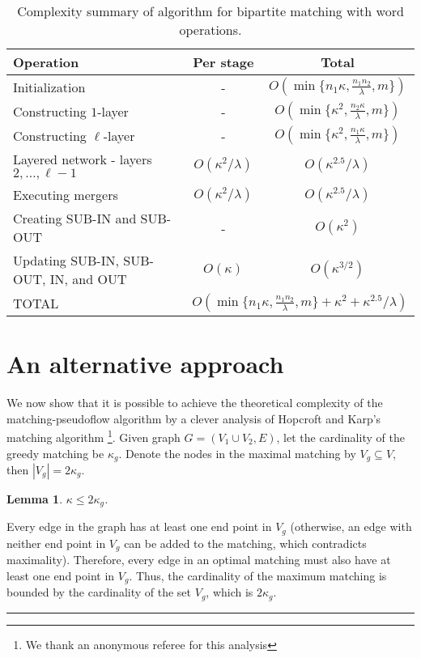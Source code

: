 \documentclass{article}
\newtheorem{lemma}{Lemma}[section]
\newenvironment{proof}[1][Proof:]{\begin{trivlist}
\item[\hskip \labelsep {\bfseries #1}]}{\end{trivlist}}
\newcommand{\qed}{\hfill \rule{2.5mm}{2.5mm}}
\begin{document}
\begin{table}[ht]
\begin{center}
\begin{tabular}{||l|c|c||} \hline
\hline Operation & Per stage & Total\\
\hline
Initialization & - & $O(\min\{n_1\kappa, \frac{n_1n_2}{\lambda},m\})$\\
Constructing $1$-layer & - & $O(\min\{\kappa^2, \frac{n_2\kappa}{\lambda},m\})$\\
Constructing $\ell$-layer & -& $O(\min\{\kappa^2,\frac{n_1\kappa}{\lambda}, m\})$ \\
Layered network - layers $2,\ldots ,\ell -1$ & $O(\kappa^{2}/\lambda)$ & $O(\kappa^{2.5}/\lambda)$\\
Executing mergers & $O(\kappa^{2}/\lambda)$ & $O(\kappa^{2.5}/\lambda)$\\
Creating SUB-IN and SUB-OUT & - & $O(\kappa^2)$ \\
Updating SUB-IN, SUB-OUT, IN, and OUT & $O(\kappa)$ & $O(\kappa^{3/2})$ \\
\hline
TOTAL &
\multicolumn{2}{|c||}{$O(\min\{n_1\kappa,\frac{n_1n_2}{\lambda},m\} + \kappa^2 + \kappa^{2.5}/\lambda)$}\\ \hline
\hline
\end{tabular}
\caption{\label{Table:complexity3}Complexity summary of algorithm for bipartite matching with word operations.}
\end{center}
\end{table}

\section{An alternative approach}
\label{sec:alternative}

We now show that it is possible to achieve the theoretical complexity of the {\sf matching-pseudoflow} algorithm by a clever analysis of Hopcroft and Karp's matching algorithm \cite{HopK73}\footnote{We thank an anonymous referee for this analysis}. Given  graph $G = (V_1 \cup V_2, E)$, let the cardinality of the greedy matching be $\kappa_g$. Denote the nodes in the maximal matching by $V_g \subseteq V$, then $|V_g| = 2 \kappa_g$.

\begin{lemma}
\label{lem:altGraphSize}
$\kappa \leq 2 \kappa_g$.
\end{lemma}
\begin{proof}
Every edge in the graph has at least one end point in $V_g$ (otherwise, an edge with neither end point in $V_g$ can be added to the matching, which contradicts maximality). Therefore, every edge in an optimal matching must also have at least one end point in $V_g$.  Thus, the cardinality of the maximum matching is bounded by the cardinality of the set $V_g$, which is $2 \kappa_g$. \qed
\end{proof}
\end{document}
